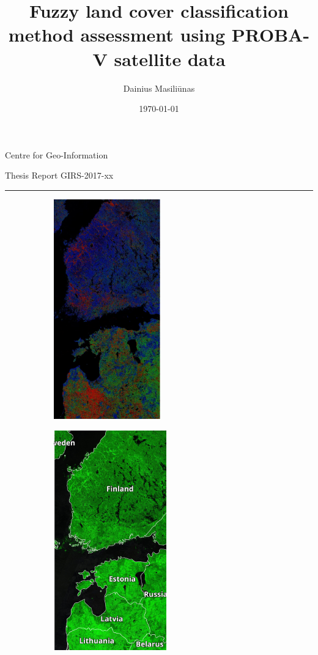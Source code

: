 \documentclass[a4paper,12pt]{scrbook}
\title{Fuzzy land cover classification method assessment using PROBA-V satellite data}
\author{Dainius Masili\=unas}
\date{\today}
\begin{document}

\begin{titlingpage}
  {\Large Centre for Geo-Information}\vspace{0.9cm}
  
  {\Large Thesis Report GIRS-2017-xx}\vspace{0.9cm}
  
  \hrule\vspace{1.1cm}
  
  {\bfseries \Large \MakeUppercase{\thetitle}}\vspace{2.0cm}
  
  \begin{figure}
    \begin{subfigure}[t]{0.25\textwidth}
      \includegraphics[height=9.5cm]{thesis-figures/figures-qgis/fulltile-rf}
    \end{subfigure}
    \begin{subfigure}[t]{0.25\textwidth}
      \includegraphics[height=9.5cm]{thesis-figures/aoi-blank}
    \end{subfigure}
    \vspace{-110pt}
  \end{figure}
  

\end{titlingpage}
\end{document}
